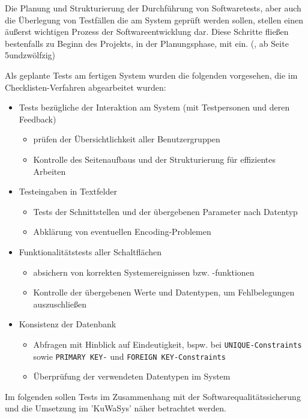 Die Planung und Strukturierung der Durchführung von Softwaretests, aber auch die Überlegung von Testfällen die am System geprüft werden sollen, stellen einen äußerst wichtigen Prozess der Softwareentwicklung dar.
Diese Schritte fließen bestenfalls zu Beginn des Projekts, in der Planungsphase, mit ein. (\cite{SPM}, ab Seite 5undzwölfzig)

Als geplante Tests am fertigen System wurden die folgenden vorgesehen, die im Checklisten-Verfahren abgearbeitet wurden:
\begin{itemize}
	\item Tests bezügliche der Interaktion am System (mit Testpersonen und deren Feedback)
	\begin{itemize} 
		 \item prüfen der Übersichtlichkeit aller Benutzergruppen
		 \item Kontrolle des Seitenaufbaus und der Strukturierung für effizientes Arbeiten
	\end{itemize}
	\item Testeingaben in Textfelder
	\begin{itemize} 
		 \item Tests der Schnittstellen und der übergebenen Parameter nach Datentyp
		 \item Abklärung von eventuellen Encoding-Problemen
	\end{itemize}
	\item Funktionalitätstests aller Schaltflächen
	\begin{itemize} 
		 \item absichern von korrekten Systemereignissen bzw. -funktionen
		 \item Kontrolle der übergebenen Werte und Datentypen, um Fehlbelegungen auszuschließen
	\end{itemize}
	\item Konsistenz der Datenbank 
	\begin{itemize} 
		 \item Abfragen mit Hinblick auf Eindeutigkeit, bspw. bei \texttt{UNIQUE-Constraints} sowie \texttt{PRIMARY KEY-} und \texttt{FOREIGN KEY-Constraints}
		 \item Überprüfung der verwendeten Datentypen im System
	\end{itemize}
\end{itemize}

Im folgenden sollen Tests im Zusammenhang mit der Softwarequalitätssicherung und die Umsetzung im 'KuWaSys' näher betrachtet werden.

